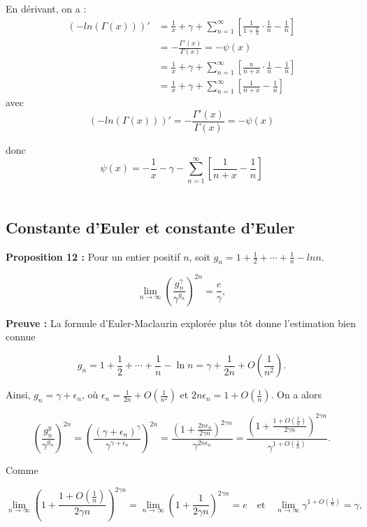 \documentclass[a4paper,12pt]{article}
\begin{document}
En dérivant, on a : \begin{align*}
(-ln(\Gamma(x)))' &= \frac{1}{x} + \gamma + \sum_{n=1}^{\infty} \left[ \frac{1}{1 + \frac{x}{n}} \cdot \frac{1}{n} - \frac{1}{n} \right] \\
& = -\frac{\Gamma'(x)}{\Gamma(x)} = -\psi(x) \\
& = \frac{1}{x} + \gamma + \sum_{n=1}^{\infty} \left[ \frac{n}{n+x} \cdot \frac{1}{n} - \frac{1}{n} \right] \\
& = \frac{1}{x} + \gamma + \sum_{n=1}^{\infty} \left[ \frac{1}{n+x} - \frac{1}{n} \right]
\end{align*} avec \[(-ln(\Gamma(x)))' =  -\frac{\Gamma'(x)}{\Gamma(x)} = -\psi(x)\]

donc \[\psi(x) = -\frac{1}{x} - \gamma - \sum_{n=1}^{\infty} \left[ \frac{1}{n+x} - \frac{1}{n} \right]\] \\


  

\subsection{Constante d'Euler et constante d'Euler}

\textbf{Proposition 12 :}
Pour un entier positif \( n \), soit \( g_n = 1 + \frac{1}{2} + \cdots + \frac{1}{n} - ln n \).

\[
\lim_{n \to \infty} \left( \frac{g_n^\gamma}{\gamma^{g_n}} \right)^{2n} = \frac{e}{\gamma},
\]

\textbf{Preuve :}
La formule d'Euler-Maclaurin explorée plus tôt donne l'estimation bien connue

\[
g_n = 1 + \frac{1}{2} + \cdots + \frac{1}{n} - \ln n = \gamma + \frac{1}{2n} + O \left( \frac{1}{n^2} \right).
\]

Ainsi, \( g_n = \gamma + \epsilon_n \), où \( \epsilon_n = \frac{1}{2n} + O \left( \frac{1}{n^2} \right) \) et \( 2n\epsilon_n = 1 + O \left( \frac{1}{n} \right) \). On a alors

\[
\left( \frac{g_n^y}{\gamma^{g_n}} \right)^{2n} = \left( \frac{(\gamma + \epsilon_n)^\gamma}{\gamma^{\gamma+\epsilon_n}} \right)^{2n} = \frac{\left( 1 + \frac{2n\epsilon_n}{2\gamma n} \right)^{2\gamma n}}{\gamma^{2n\epsilon_n}} = \frac{\left( 1 + \frac{1+O\left( \frac{1}{n} \right)}{2 \gamma n} \right)^{2 \gamma n}}{\gamma^{1+O\left( \frac{1}{n} \right)}}.
\]

Comme

\[
\lim_{n \to \infty} \left( 1 + \frac{1 + O \left( \frac{1}{n} \right)}{2\gamma n} \right)^{2 \gamma n} = \lim_{n \to \infty} \left( 1 + \frac{1}{2 \gamma n} \right)^{2 \gamma n} = e \quad \text{et} \quad \lim_{n \to \infty} \gamma^{1+O\left( \frac{1}{n} \right)} = \gamma,
\]
\end{document}
